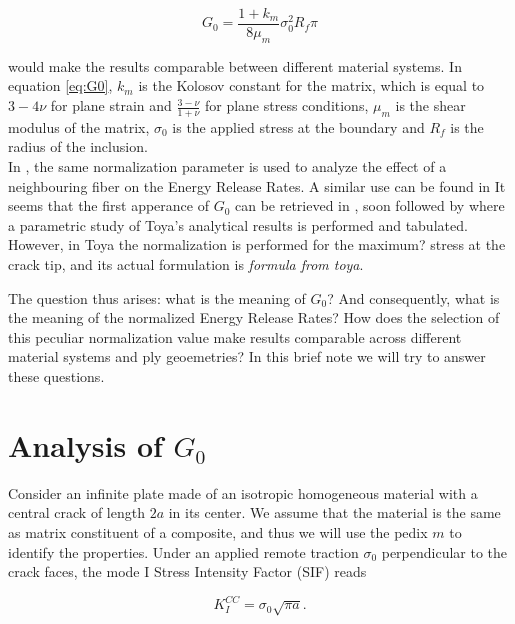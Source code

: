 \documentclass[a4paper]{jpconf}
\begin{document}
\begin{equation}
\label{eq:G0}
G_{0} = \frac{1+k_{m}}{8\mu_{m}}\sigma_{0}^{2}R_{f}\pi
\end{equation}

would make the results comparable between different material systems. In equation \ref{eq:G0}, $k_{m}$ is the Kolosov constant for the matrix, which is equal to $3-4\nu$ for plane strain and $\frac{3-\nu}{1+\nu}$ for plane stress conditions, $\mu_{m}$ is the shear modulus of the matrix, $\sigma_{0}$ is the applied stress at the boundary and $R_{f}$ is the radius of the inclusion. \\
In \cite{sevilla two fiber}, the same normalization parameter is used to analyze the effect of a neighbouring fiber on the Energy Release Rates. A similar use can be found in \cite{Linqi} It seems that the first apperance of $G_{0}$ can be retrieved in \cite{Toya}, soon followed by \cite{handbook of SIF} where a parametric study of Toya's analytical results is performed and tabulated. However, in Toya the normalization is performed for the maximum? stress at the crack tip, and its actual formulation is \textit{formula from toya}.

The question thus arises: what is the meaning of $G_{0}$? And consequently, what is the meaning of the normalized Energy Release Rates? How does the selection of this peculiar normalization value make results comparable across different material systems and ply geoemetries? In this brief note we will try to answer these questions.


\section{Analysis of $G_{0}$}

Consider an infinite plate made of an isotropic homogeneous material with a central crack of length $2a$ in its center. We assume that the material is the same as matrix constituent of a composite, and thus we will use the pedix $m$ to identify the properties. Under an applied remote traction $\sigma_{0}$ perpendicular to the crack faces, the mode I Stress Intensity Factor (SIF) reads \cite{find ref}

\begin{equation}
\label{eq:cc-plate-k1}
K_{I}^{CC} = \sigma_{0}\sqrt{\pi a}.
\end{equation}
\end{document}
